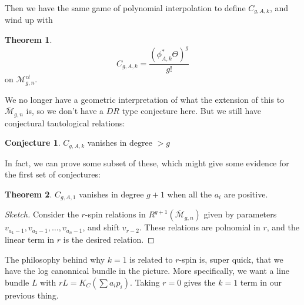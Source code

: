 \documentclass{amsart}
\theoremstyle{definition}
\newtheorem{theorem}{Theorem}
\newtheorem{conjecture}{Conjecture}
\newcommand{\Mbar}{\overline{\mathcal{M}}}
\newcommand{\M}{\mathcal{M}}
\begin{document}
Then we have the same game of polynomial interpolation to define $C_{g,A,k}$, and wind up with

\begin{theorem}
$$C_{g,A,k}=\frac{(\phi^*_{A,k}\Theta)^g}{g!}$$ on $\M^{ct}_{g,n}$.
\end{theorem}


We no longer have a geometric interpretation of what the extension of this to $\Mbar_{g,n}$ is, so we don't have a $DR$ type conjecture here.  But we still have conjectural tautological relations:

\begin{conjecture}
$C_{g,A,k}$ vanishes in degree $>g$
\end{conjecture}

In fact, we can prove some subset of these, which might give some evidence for  the first set of conjectures:
\begin{theorem}
$C_{g,A,1}$ vanishes in degree $g+1$ when all the $a_i$ are positive.
\end{theorem}

\begin{proof}[Sketch]
Consider the $r$-spin relations in $R^{g+1}(\Mbar_{g,n})$ given by parameters $v_{a_1-1}, v_{a_2-1},\dots, v_{a_n-1}$, and shift $v_{r-2}$.  These relations are polnomial in $r$, and the linear term in $r$ is the desired relation.
\end{proof}

The philosophy behind why $k=1$ is related to $r$-spin is, super quick, that we have the log canonnical bundle in the picture.  More specifically, we want a line bundle $L$ with $rL=K_C(\sum a_ip_i)$.  Taking $r=0$ gives the $k=1$ term in our previous thing.
\end{document}
